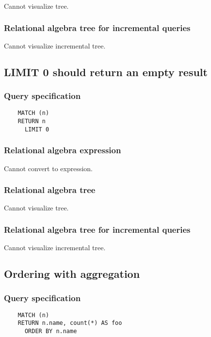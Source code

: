 	Cannot visualize tree.

	\subsubsection*{Relational algebra tree for incremental queries}

	Cannot visualize incremental tree.
	\subsection{LIMIT 0 should return an empty result}

	\subsubsection*{Query specification}

	\begin{lstlisting}
	MATCH (n)
	RETURN n
	  LIMIT 0
	\end{lstlisting}


	\subsubsection*{Relational algebra expression}

	Cannot convert to expression.

	\subsubsection*{Relational algebra tree}

	Cannot visualize tree.

	\subsubsection*{Relational algebra tree for incremental queries}

	Cannot visualize incremental tree.
	\subsection{Ordering with aggregation}

	\subsubsection*{Query specification}

	\begin{lstlisting}
	MATCH (n)
	RETURN n.name, count(*) AS foo
	  ORDER BY n.name
	\end{lstlisting}


